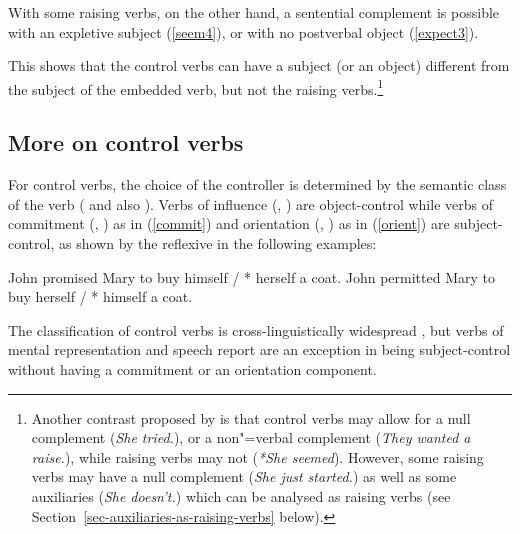 \documentclass[output=paper
	        ,collection
	        ,collectionchapter
 	        ,biblatex
                ,babelshorthands
                ,newtxmath
                ,draftmode
                ,colorlinks, citecolor=brown
]{langscibook}
\begin{document}
\eal
{}
\zl

\eal
{}
\zl

With some raising verbs, on the other hand, a sentential complement is possible with an expletive
subject (\ref{seem4}), or with no postverbal object (\ref{expect3}). 

\eal
{}
\zl

\noindent
This shows that the control verbs can have a subject (or an object) different from the subject of
the embedded verb, but not the raising verbs.\footnote{%
  Another contrast proposed by
  \citet{Jacobson1990}\iaddpages is that control verbs may allow for a null complement (\emph{She tried.}), or
  a non"=verbal complement (\emph{They wanted a raise.}), while raising verbs may not (\emph{*She
    seemed}). However, some raising verbs may have a null complement (\emph{She just started.}) as
  well as some auxiliaries (\emph{She doesn't.}) which can be analysed as raising verbs (see
  Section~\ref{sec-auxiliaries-as-raising-verbs} below).%
} 

\subsection{More on control verbs}

For control verbs, the choice of the controller is determined by the semantic class of the verb
(\citealt[Chapter~3]{PollardandSag1992} and also \citealt{JackendoffandCulicover2003}).  Verbs of
influence (, ) are object-control while verbs of commitment
(, ) as in (\ref{commit}) and orientation (, ) as in
(\ref{orient}) are subject-control, as shown by the reflexive in the following examples: 

\eal
\ex\label{ex-John-promised-Mary-to-buy}
John promised Mary to buy himself / * herself a coat. \label{commit}
\ex\label{ex-John-permitted-Mary-to-buy} 
John permitted Mary to buy herself / * himself a coat.\label{orient}
\zl
 
  The classification of control verbs is cross-linguistically widespread \citep{VanValinandLapolla1997}, but  verbs of mental representation and speech report are an exception in being subject-control without having a commitment or an orientation component.
\end{document}
